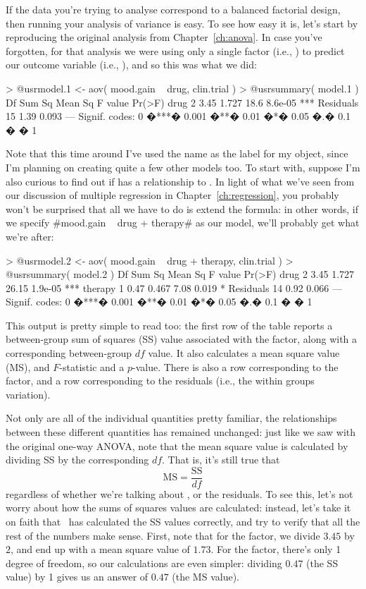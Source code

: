 If the data you're trying to analyse correspond to a balanced factorial design, then running your analysis of variance is easy. To see how easy it is, let's start by reproducing the original analysis from Chapter~\ref{ch:anova}. In case you've forgotten, for that analysis we were using only a single factor (i.e., ) to predict our outcome variable (i.e., ), and so this was what we did:
\begin{rblock1}
> @usr{model.1 <- aov( mood.gain ~ drug, clin.trial )}  
> @usr{summary( model.1 )}  
            Df Sum Sq Mean Sq F value  Pr(>F)    
drug         2   3.45   1.727    18.6 8.6e-05 ***
Residuals   15   1.39   0.093                                      
---
Signif. codes:  0 �***� 0.001 �**� 0.01 �*� 0.05 �.� 0.1 � � 1 
\end{rblock1}
Note that this time around I've used the name  as the label for my  object, since I'm planning on creating quite a few other models too. To start with, suppose I'm also curious to find out if  has a relationship to . In light of what we've seen from our discussion of multiple regression in Chapter~\ref{ch:regression}, you probably won't be surprised that all we have to do is extend the formula: in other words, if we specify \rtextverb#mood.gain ~ drug + therapy# as our model, we'll probably get what we're after:
\begin{rblock1}
> @usr{model.2 <- aov( mood.gain ~ drug + therapy, clin.trial )}  
> @usr{summary( model.2 )} 
            Df Sum Sq Mean Sq F value  Pr(>F)    
drug         2   3.45   1.727   26.15 1.9e-05 ***
therapy      1   0.47   0.467    7.08   0.019 *  
Residuals   14   0.92   0.066                     
---
Signif. codes:  0 �***� 0.001 �**� 0.01 �*� 0.05 �.� 0.1 � � 1 
\end{rblock1}
This output is pretty simple to read too: the first row of the table reports a between-group sum of squares (SS) value associated with the  factor, along with a corresponding between-group $df$ value. It also calculates a mean square value (MS), and $F$-statistic and a $p$-value. There is also a row corresponding to the  factor, and a row corresponding to the residuals (i.e., the within groups variation). 

Not only are all of the individual quantities pretty familiar, the relationships between these different quantities has remained unchanged: just like we saw with the original one-way ANOVA, note that the mean square value is calculated by dividing SS by the corresponding $df$. That is, it's still true that
$$
\mbox{MS} = \frac{\mbox{SS}}{df}
$$
regardless of whether we're talking about ,  or the residuals. To see this, let's not worry about how the sums of squares values are calculated: instead, let's take it on faith that \R\ has calculated the SS values correctly, and try to verify that all the rest of the numbers make sense. First, note that for the  factor, we divide $3.45$ by $2$, and end up with a mean square value of $1.73$. For the  factor, there's only 1 degree of freedom, so our calculations are even simpler: dividing $0.47$ (the SS value) by 1 gives us an answer of $0.47$ (the MS value). 

